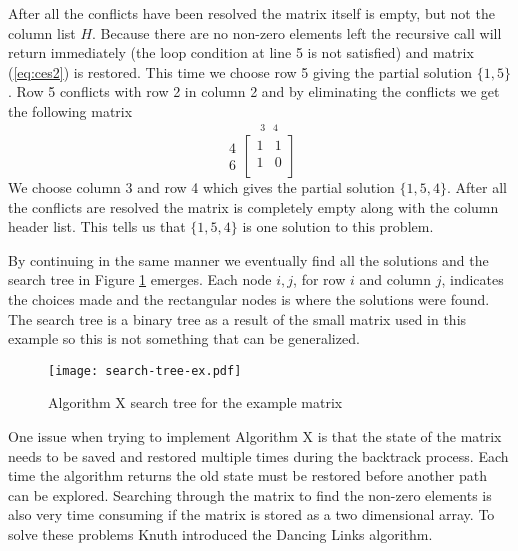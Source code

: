 After all the conflicts have been resolved the matrix itself is empty, but not the column list $H$.
Because there are no non-zero elements left the recursive call will return immediately (the loop condition at line 5 is not satisfied) and matrix (\ref{eq:ces2}) is restored.
This time we choose row 5 giving the partial solution $\{ 1, 5 \}$.
Row 5 conflicts with row 2 in column 2 and by eliminating the conflicts we get the following matrix
\begin{equation}
	\label{eq:ces3}
	\begin{array}{r} 4\\ 6 \end{array}
	\stackrel{
		\begin{array}{ccc} 3 & 4 \end{array}
	}{
		\begin{bmatrix}
			1 & 1 \\
			1 & 0 \\
		\end{bmatrix}
	}
\end{equation}
We choose column 3 and row 4 which gives the partial solution $\{ 1, 5, 4 \}$.
After all the conflicts are resolved the matrix is completely empty along with the column header list.
This tells us that $\{ 1, 5, 4 \}$ is one solution to this problem.

By continuing in the same manner we eventually find all the solutions and the search tree in Figure \ref{fig:ex_tree} emerges.
Each node $i,j$, for row $i$ and column $j$, indicates the choices made and the rectangular nodes is where the solutions were found.
The search tree is a binary tree as a result of the small matrix used in this example so this is not something that can be generalized.
\begin{figure}[H]
	\centering 
	\texttt{[image: search-tree-ex.pdf]}
	\caption{Algorithm X search tree for the example matrix}
	\label{fig:ex_tree}
\end{figure}

One issue when trying to implement Algorithm X is that the state of the matrix needs to be saved and restored multiple times during the backtrack process.
Each time the algorithm returns the old state must be restored before another path can be explored.
Searching through the matrix to find the non-zero elements is also very time consuming if the matrix is stored as a two dimensional array.
To solve these problems Knuth introduced the Dancing Links algorithm.



